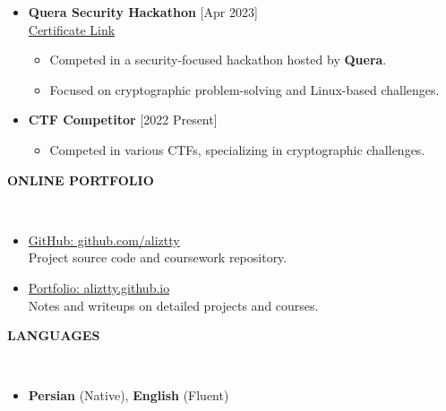 \documentclass[10pt,article]{article}
\newcommand{\resheading}[1]{%
  {\small \colorbox{mygrey}{%
  \begin{minipage}{0.99\textwidth}\centering \textbf{#1 \vphantom{p\^{E}}}\end{minipage}}}}
\begin{document}
\begin{itemize}
\setlength\itemsep{0.1cm}
\item \textbf{Quera Security Hackathon} \hfill {[Apr 2023]}\\[0.1cm]
	\href{https://quera.org/media/public/quera_certificate/e086b9784d5544bc82780bea6581cf4a.jpg}{Certificate Link}
	\begin{itemize}[noitemsep,nolistsep]
		\setlength{\itemsep}{0.1cm}
		\item Competed in a security-focused hackathon hosted by \textbf{Quera}.
		\item Focused on cryptographic problem-solving and Linux-based challenges.
	\end{itemize}

\item \textbf{CTF Competitor} \hfill {[2022 Present]}
	\begin{itemize}[noitemsep,nolistsep]
	  \item Competed in various CTFs, specializing in cryptographic challenges.
	\end{itemize}
\end{itemize}

\noindent
\resheading{ONLINE PORTFOLIO}\\[-0.5em]
\begin{itemize}
\item \href{https://github.com/aliztty}{GitHub: github.com/aliztty} \\
	Project source code and coursework repository.
\item \href{https://aliztty.github.io/}{Portfolio: aliztty.github.io}\\
    Notes and writeups on detailed projects and courses.
\end{itemize}

\noindent
\resheading{LANGUAGES}\\[-0.5em]
\begin{itemize}[noitemsep,nolistsep]
	\item \textbf{Persian} (Native), \textbf{English} (Fluent)
\end{itemize}
\end{document}
